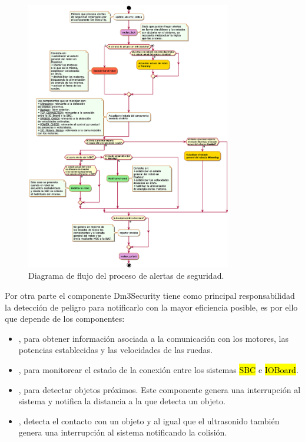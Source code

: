 \documentclass[withindex,glossary]{cam-thesis}
\begin{document}
\begin{figure}[H]
\centering
\label{fig: Diagrama_de_flujo_proceso_alertas_de_seguridad}
\includegraphics[width=0.8\textwidth]{images/Diagrama_de_flujo_Dm3Security_update_status}
\caption[Diagrama de flujo del proceso de alertas de seguridad]{Diagrama de flujo del proceso de alertas de seguridad.}
\end{figure}

Por otra parte el componente Dm3Security tiene como principal responsabilidad la detección de peligro para notificarlo con la mayor eficiencia posible, es por ello que depende de los componentes:
\begin{itemize}
\item  {}, para obtener información asociada a la comunicación con los motores, las potencias establecidas y las velocidades de las ruedas.
\item  {}, para monitorear el estado de la conexión entre los sistemas \hl{SBC} e \hl{IOBoard}.
\item  {}, para detectar objetos próximos. Este componente genera una interrupción al sistema y notifica la distancia a la que detecta un objeto.
\item  {}, detecta el contacto con un objeto y al igual que el ultrasonido también genera una interrupción al sistema notificando la colisión.
\end{itemize}
\end{document}
